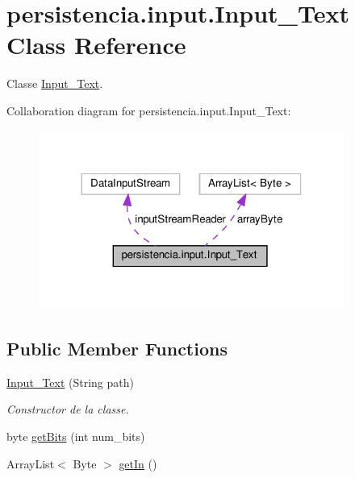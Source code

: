 \hypertarget{classpersistencia_1_1input_1_1Input__Text}{}\section{persistencia.\+input.\+Input\+\_\+\+Text Class Reference}
\label{classpersistencia_1_1input_1_1Input__Text}


Classe \hyperlink{classpersistencia_1_1input_1_1Input__Text}{Input\+\_\+\+Text}.  




Collaboration diagram for persistencia.\+input.\+Input\+\_\+\+Text\+:
\nopagebreak
\begin{figure}[H]
\begin{center}
\leavevmode
\includegraphics[width=284pt]{classpersistencia_1_1input_1_1Input__Text__coll__graph}
\end{center}
\end{figure}
\subsection*{Public Member Functions}
\begin{DoxyCompactItemize}
\item 
\hyperlink{classpersistencia_1_1input_1_1Input__Text_a9027dd15a85630115b38369358defd04}{Input\+\_\+\+Text} (String path)
\begin{DoxyCompactList}\small\item\em Constructor de la classe. \end{DoxyCompactList}\item 
byte \hyperlink{classpersistencia_1_1input_1_1Input__Text_a471f357f566d79f224a9cc51967f34ef}{get\+Bits} (int num\+\_\+bits)
\item 
Array\+List$<$ Byte $>$ \hyperlink{classpersistencia_1_1input_1_1Input__Text_a36c0224f7ac8f3a60a80bacc571dd3be}{get\+In} ()
\end{DoxyCompactItemize}
